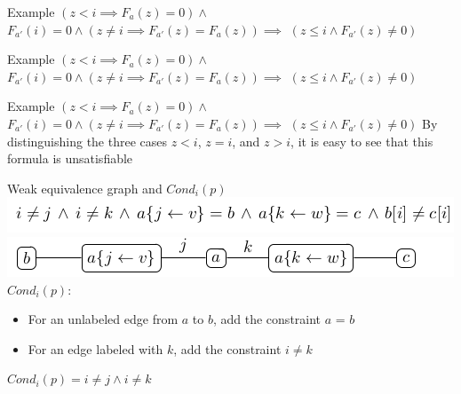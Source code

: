 \documentclass{beamer}
\begin{document}
\begin{frame}{Example}
$(z < i \implies F_a(z) = 0) \wedge$\newline
$F_{a'}(i) = 0 \wedge (z \ne i \implies F_{a'}(z) = F_a(z))\implies$\newline
$(z \le i \wedge F_{a'}(z) \ne 0)$
\end{frame}

\begin{frame}{Example}
$(z < i \implies F_a(z) = 0) \wedge$\newline
$F_{a'}(i) = 0 \wedge (z \ne i \implies F_{a'}(z) = F_a(z))\implies$\newline
$(z \le i \wedge F_{a'}(z) \ne 0)$\newline
\end{frame}

\begin{frame}{Example}
$(z < i \implies F_a(z) = 0) \wedge$\newline
$F_{a'}(i) = 0 \wedge (z \ne i \implies F_{a'}(z) = F_a(z))\implies$\newline
$(z \le i \wedge F_{a'}(z) \ne 0)$\newline
By distinguishing the three cases $z < i$, $z = i$, and $z > i$, it is easy to see that this formula is unsatisfiable
\end{frame}

\begin{frame}{Weak equivalence graph and $Cond_i(p)$}
\includegraphics[scale=0.5]{weak1.png}\newline
\includegraphics[scale=0.5]{weak2.png}\newline
$Cond_i(p)$:
\begin{itemize}
\item For an unlabeled edge from $a$ to $b$, add the constraint $a$ = $b$
\item For an edge labeled with $k$, add the constraint $i \neq k$
\end{itemize}
$Cond_i (p) = i \neq j \wedge i \neq k$
\end{frame}
\end{document}
